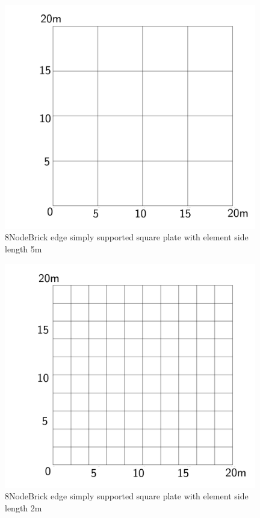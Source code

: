 \documentclass[fleqn,11pt]{article}
\begin{document}
\newpage

\begin{figure}[H]
  \centering
  \includegraphics[width=11cm]{../Figure-files/square_plate2.pdf}
  \caption{8NodeBrick edge simply supported square plate with element side length 5m }
  \label{fig 8NodeBrick edges simply supported square plate with element side length 5m }
\end{figure}


\begin{figure}[H]
  \centering
  \includegraphics[width=11cm]{../Figure-files/square_plate3.pdf}
  \caption{8NodeBrick edge simply supported square plate with element side length 2m }
  \label{fig 8NodeBrick edges simply supported square plate with element side length 2m }
\end{figure}
\end{document}
